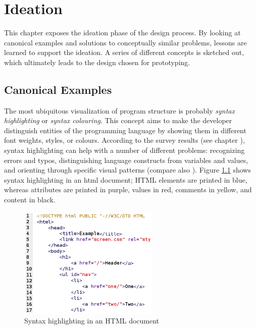 \chapter{Ideation}\label{ideation}

This chapter exposes the ideation phase of the design process. By
looking at canonical examples and solutions to conceptually similar
problems, lessons are learned to support the ideation. A series of
different concepts is sketched out, which ultimately leads to the design
chosen for prototyping.

\section{Canonical Examples}\label{similar}

The most ubiquitous visualization of program structure is probably
\emph{syntax highlighting} or \emph{syntax colouring}. This concept aims
to make the developer distinguish entities of the programming language
by showing them in different font weights, styles, or colours. According
to the survey results (see chapter ), syntax
highlighting can help with a number of different problems: recognizing
errors and typos, distinguishing language constructs from variables and
values, and orienting through specific visual patterns (compare also
). Figure \ref{fig:syntaxhighlighting} shows syntax
highlighting in an \ac{html} document; HTML elements are printed in
blue, whereas attributes are printed in purple, values in red, comments
in yellow, and content in black.

\begin{figure}[H]
\centering
\includegraphics[keepaspectratio,width=0.6\textwidth]{img/syntax_highlighting.png}
\caption{Syntax highlighting in an HTML document}
\label{fig:syntaxhighlighting}
\end{figure}

